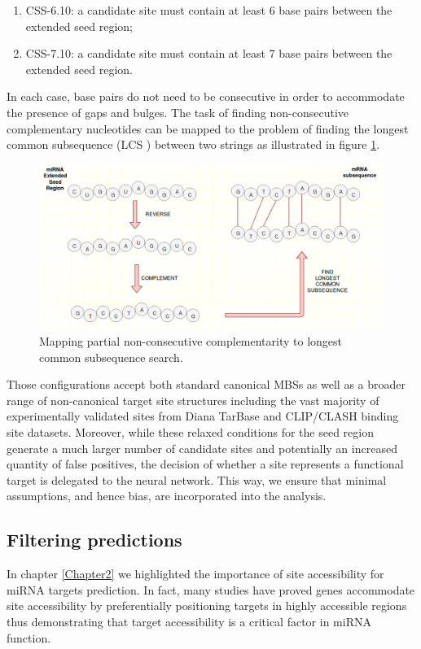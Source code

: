 \begin{enumerate}
	\item CSS-6.10: a candidate site must contain at least 6 base pairs between the extended seed region;
	\item CSS-7.10: a candidate site must contain at least 7 base pairs between the extended seed region.
\end{enumerate}

In each case, base pairs do not need to be consecutive in order to accommodate the presence of gaps and bulges. The task of finding non-consecutive complementary nucleotides can be mapped to the problem of finding the longest common subsequence (LCS ) between two strings as illustrated in figure \ref{fig:lcs}.

\begin{figure}[hbt!]
	\centering
	\includegraphics[width=1\textwidth]{Figures/lcs}
	\caption{Mapping partial non-consecutive complementarity to longest common subsequence search.}
	\label{fig:lcs}
\end{figure}

Those configurations accept both standard canonical MBSs as well as a broader
range of non-canonical target site structures including the vast majority of experimentally validated sites from Diana TarBase and CLIP/CLASH binding site
datasets. Moreover, while these relaxed conditions for the seed region generate a much larger number of candidate sites and potentially an increased quantity of false positives, the decision of whether a site represents a functional target is delegated to the neural network. This way, we ensure that minimal assumptions, and hence bias, are incorporated into the analysis. 

\subsection{Filtering predictions}
In chapter \ref{Chapter2} we highlighted the importance of site accessibility for miRNA targets prediction. In fact, many studies \cite{helwak} \cite{common_features} have proved genes accommodate site accessibility by preferentially positioning targets in highly accessible regions \cite{accessibility_nrg_role} thus demonstrating that target accessibility is a critical factor in miRNA function.

